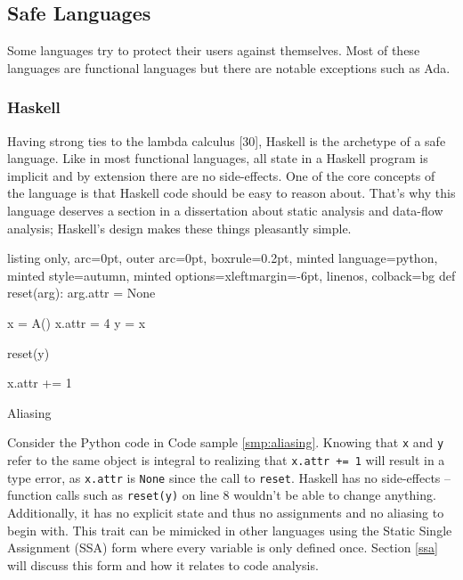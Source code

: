 \documentclass[a4paper, 16pt, oneside]{Thesis}
\begin{document}
\subsection{Safe Languages}\label{safe-languages}

Some languages try to protect their users against themselves. Most of
these languages are functional languages but there are notable
exceptions such as Ada.

\subsubsection{Haskell}\label{haskell}

Having strong ties to the lambda calculus {[}30{]}, Haskell is the
archetype of a safe language. Like in most functional languages, all
state in a Haskell program is implicit and by extension there are no
side-effects. One of the core concepts of the language is that Haskell
code should be easy to reason about. That's why this language deserves a
section in a dissertation about static analysis and data-flow analysis;
Haskell's design makes these things pleasantly simple.

\begin{code}
  \begin{tcblisting}{listing only, 
  arc=0pt,
  outer arc=0pt, 
  boxrule=0.2pt,
  minted language=python,
  minted style=autumn,
  minted options={xleftmargin=-6pt, linenos},
  colback=bg }
def reset(arg):
  arg.attr = None

x = A()
x.attr = 4
y = x

reset(y)

x.attr += 1
\end{tcblisting}
\caption{Aliasing}\label{smp:aliasing}
\end{code}

Consider the Python code in Code sample \ref{smp:aliasing}. Knowing that
\texttt{x} and \texttt{y} refer to the same object is integral to
realizing that \texttt{x.attr\ +=\ 1} will result in a type error, as
\texttt{x.attr} is \texttt{None} since the call to \texttt{reset}.
Haskell has no side-effects -- function calls such as \texttt{reset(y)}
on line 8 wouldn't be able to change anything. Additionally, it has no
explicit state and thus no assignments and no aliasing to begin with.
This trait can be mimicked in other languages using the Static Single
Assignment (SSA) form where every variable is only defined once. Section
\ref{ssa} will discuss this form and how it relates to code analysis.
\end{document}
